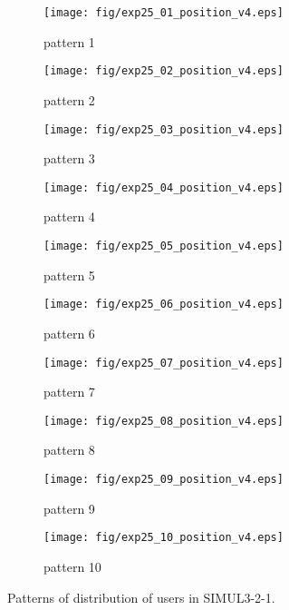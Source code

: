 \begin{figure}
	\begin{center}
		\begin{subfigure}[b]{0.32\textwidth}
			\texttt{[image: fig/exp25\_01\_position\_v4.eps]}
			\caption{pattern 1}
			\label{figure:simul3_2_1_a}
		\end{subfigure}
		\begin{subfigure}[b]{0.32\textwidth}
			\texttt{[image: fig/exp25\_02\_position\_v4.eps]}
			\caption{pattern 2}
			\label{figure:simul3_2_1_b}
		\end{subfigure}
		\begin{subfigure}[b]{0.32\textwidth}
			\texttt{[image: fig/exp25\_03\_position\_v4.eps]}
			\caption{pattern 3}
			\label{figure:simul3_2_1_c}
		\end{subfigure}
		\begin{subfigure}[b]{0.32\textwidth}
			\texttt{[image: fig/exp25\_04\_position\_v4.eps]}
			\caption{pattern 4}
			\label{figure:simul3_2_1_d}
		\end{subfigure}
		\begin{subfigure}[b]{0.32\textwidth}
			\texttt{[image: fig/exp25\_05\_position\_v4.eps]}
			\caption{pattern 5}
			\label{figure:simul3_2_1_e}
		\end{subfigure}
		\begin{subfigure}[b]{0.32\textwidth}
			\texttt{[image: fig/exp25\_06\_position\_v4.eps]}
			\caption{pattern 6}
			\label{figure:simul3_2_1_f}
		\end{subfigure}
		\begin{subfigure}[b]{0.32\textwidth}
			\texttt{[image: fig/exp25\_07\_position\_v4.eps]}
			\caption{pattern 7}
			\label{figure:simul3_2_1_g}
		\end{subfigure}
		\begin{subfigure}[b]{0.32\textwidth}
			\texttt{[image: fig/exp25\_08\_position\_v4.eps]}
			\caption{pattern 8}
			\label{figure:simul3_2_1_h}
		\end{subfigure}
		\begin{subfigure}[b]{0.32\textwidth}
			\texttt{[image: fig/exp25\_09\_position\_v4.eps]}
			\caption{pattern 9}
			\label{figure:simul3_2_1_i}
		\end{subfigure}
		\begin{subfigure}[b]{0.32\textwidth}
			\texttt{[image: fig/exp25\_10\_position\_v4.eps]}
			\caption{pattern 10}
			\label{figure:simul3_2_1_j}
		\end{subfigure}
		\caption{Patterns of distribution of users in SIMUL3-2-1.}
		\label{figure:simul3_2_1_p}
	\end{center}
\end{figure}

